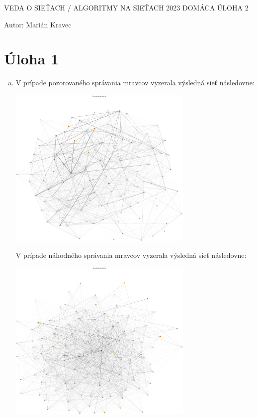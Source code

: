 \documentclass[a4paper]{article}
\begin{document}
 
	
\pagestyle{plain}

\begin{center}
	\sc\large
	VEDA O SIEŤACH / ALGORITMY NA SIEŤACH 2023
	DOMÁCA ÚLOHA 2
\end{center}

Autor: Marián Kravec

\section{Úloha 1}

\begin{enumerate}[(a)]
	\item 
	V prípade pozorovaného správania mravcov vyzerala výsledná sieť následovne:
	
	\centerline{\includegraphics[width=0.7\textwidth]{norm_mravce}}
	
	V prípade náhodného správania mravcov vyzerala výsledná sieť následovne:
	
	\centerline{\includegraphics[width=0.7\textwidth]{rand_mravce}}
	

\end{enumerate}
\end{document}
